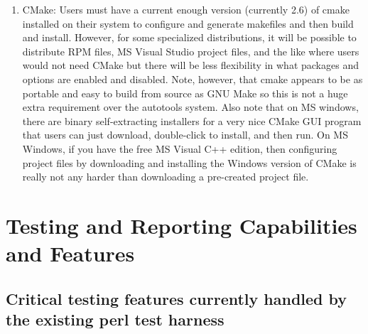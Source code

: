 \documentclass[pdf,ps2pdf,11pt]{SANDreport}
\begin{document}
\begin{enumerate}
\begin{enumerate}
  {}\item CMake: Users must have a current enough version (currently
  2.6) of cmake installed on their system to configure and generate
  makefiles and then build and install.  However, for some specialized
  distributions, it will be possible to distribute RPM files, MS
  Visual Studio project files, and the like where users would not need
  CMake but there will be less flexibility in what packages and
  options are enabled and disabled.  Note, however, that cmake appears
  to be as portable and easy to build from source as GNU Make so this
  is not a huge extra requirement over the autotools system.  Also
  note that on MS windows, there are binary self-extracting installers
  for a very nice CMake GUI program that users can just download,
  double-click to install, and then run.  On MS Windows, if you have
  the free MS Visual C++ edition, then configuring project files by
  downloading and installing the Windows version of CMake is really
  not any harder than downloading a pre-created project file.

  \end{enumerate}

\end{enumerate}


%
\section{Testing and Reporting Capabilities and Features}
%


%
{}\subsection{Critical testing features currently handled by the
existing perl test harness}
%
\end{document}

